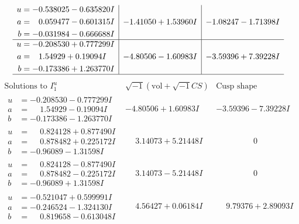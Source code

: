\documentclass[1p]{elsarticle_modified}
\theoremstyle{definition}
\newcommand{\I}{\sqrt{-1}}
\begin{document}
$$\begin{array}{c|c|c}
\begin{aligned}
u &= -0.538025 - 0.635820 I \\
a &= \phantom{-}0.059477 - 0.601315 I \\
b &= -0.031984 - 0.666688 I\end{aligned}
 & -1.41050 + 1.53960 I & -1.08247 - 1.71398 I \\ \hline\begin{aligned}
u &= -0.208530 + 0.777299 I \\
a &= \phantom{-}1.54929 + 0.19094 I \\
b &= -0.173386 + 1.263770 I\end{aligned}
 & -4.80506 - 1.60983 I & -3.59396 + 7.39228 I\\
 \hline 
 \end{array}$$\newpage$$\begin{array}{c|c|c}  
\text{Solutions to }I^u_{1}& \I (\text{vol} + \sqrt{-1}CS) & \text{Cusp shape}\\
 \hline 
\begin{aligned}
u &= -0.208530 - 0.777299 I \\
a &= \phantom{-}1.54929 - 0.19094 I \\
b &= -0.173386 - 1.263770 I\end{aligned}
 & -4.80506 + 1.60983 I & -3.59396 - 7.39228 I \\ \hline\begin{aligned}
u &= \phantom{-}0.824128 + 0.877490 I \\
a &= \phantom{-}0.878482 + 0.225172 I \\
b &= -0.96089 - 1.31598 I\end{aligned}
 & \phantom{-}3.14073 + 5.21448 I & \phantom{-0.000000 } 0 \\ \hline\begin{aligned}
u &= \phantom{-}0.824128 - 0.877490 I \\
a &= \phantom{-}0.878482 - 0.225172 I \\
b &= -0.96089 + 1.31598 I\end{aligned}
 & \phantom{-}3.14073 - 5.21448 I & \phantom{-0.000000 } 0 \\ \hline\begin{aligned}
u &= -0.521047 + 0.599991 I \\
a &= -0.246524 - 1.324130 I \\
b &= \phantom{-}0.819658 - 0.613048 I\end{aligned}
 & \phantom{-}4.56427 + 0.06184 I & \phantom{-}9.79376 + 2.89093 I \\ \hline\begin{aligned}

\end{aligned}
\end{array}$$
\end{document}
